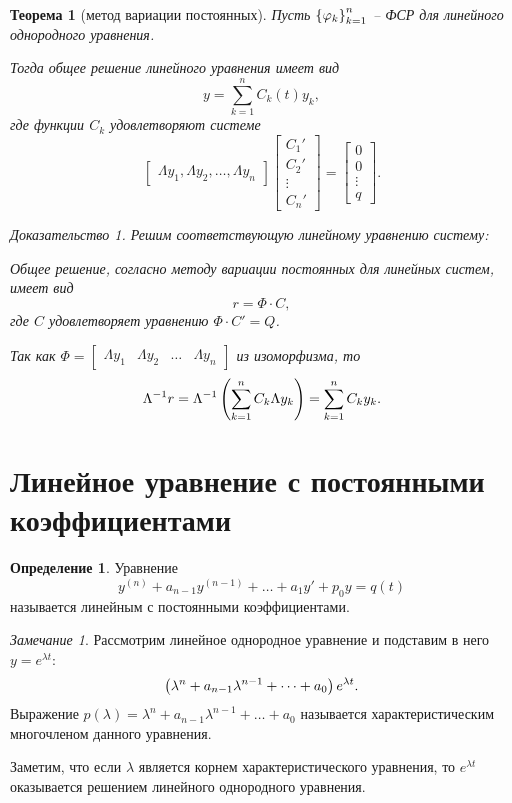 \documentclass[a5paper, 10pt]{article}
\theoremstyle{definition}
\newtheorem{Def}{Определение}
\theoremstyle{plain}
\newtheorem{Th}{Теорема}
\theoremstyle{remark}
\newtheorem*{Note}{Замечание}
\newtheorem*{Proof}{Доказательство}
\begin{document}
	\begin{Th}[метод вариации постоянных]
		Пусть $\left\{\varphi_k\right\}_{k=1}^n$ -- ФСР для линейного однородного уравнения. 
		
		Тогда общее решение линейного уравнения имеет вид 
		\[
		y = \sum\limits_{k=1}^n C_k(t) y_k,
		\]
		где функции $C_k$ удовлетворяют системе
		\[
		\begin{bmatrix}
			\Lambda y_1, \Lambda y_2, \dots, \Lambda y_n
		\end{bmatrix}
		\begin{bmatrix}
			C_1'\\C_2'\\\vdots\\C_n'
		\end{bmatrix}
		=
		\begin{bmatrix}
			0\\0\\\vdots\\q
		\end{bmatrix}.
		\]
		\begin{Proof}
			Решим соответствующую линейному уравнению систему:
			
			Общее решение, согласно методу вариации постоянных для линейных систем, имеет вид
			\[
			r = \Phi \cdot C,
			\]
			где $C$ удовлетворяет уравнению $\Phi \cdot C' = Q$.
			
			Так как $\Phi = \begin{bmatrix}
				\Lambda y_1 & \Lambda y_2 &\dots & \Lambda y_n
			\end{bmatrix}$ из изоморфизма, то 
		\[
		\Lambda^{-1} r = \Lambda^{-1} \left(\sum\limits_{k=1}^n C_k \Lambda y_k\right) = \sum\limits_{k=1}^n C_k y_k.
		\]
		\end{Proof}
	\end{Th}
	
	\section{Линейное уравнение с постоянными коэффициентами}
	\begin{Def}
		Уравнение 
		\[
					y^{(n)} + a_{n-1} y^{(n-1)} + \dots + a_1 y' + p_0 y = q(t)
		\]
		называется линейным с постоянными коэффициентами.
	\end{Def}
	
	\begin{Note}
		Рассмотрим линейное однородное уравнение и подставим в него $y=e^{\lambda t}$:
		\[
		\left(\lambda^n + a_{n-1} \lambda^{n-1} + \dots + a_0\right) e^{\lambda t}.
		\]
		Выражение $p(\lambda) = \lambda^n + a_{n-1} \lambda^{n-1} + \dots + a_0$ называется характеристическим многочленом данного уравнения.
		
		Заметим, что если $\lambda$ является корнем характеристического уравнения, то $e^{\lambda t}$ оказывается решением линейного однородного уравнения.
	\end{Note}
	
\end{document}
